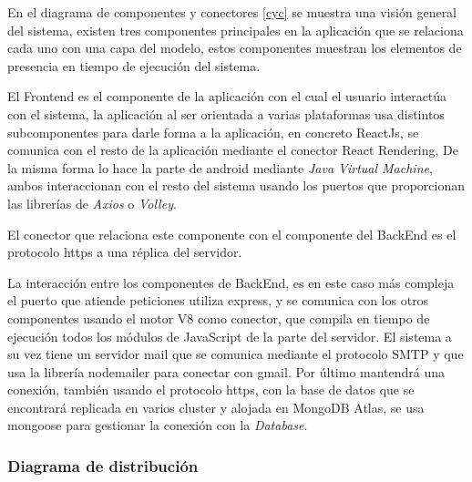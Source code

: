 \documentclass{article}
\begin{document}
En el diagrama de componentes y conectores \ref{cyc} se muestra una visión general del sistema, existen tres componentes principales en la aplicación que se relaciona cada uno con una capa del modelo, estos componentes muestran los elementos de presencia en tiempo de ejecución del sistema.

El Frontend es el componente de la aplicación con el cual el usuario interactúa con el sistema, la aplicación al ser orientada a varias plataformas usa distintos subcomponentes para darle forma a la aplicación, en concreto ReactJs, se comunica con el resto de la aplicación mediante el conector React Rendering, De la misma forma lo hace la parte de android mediante \textit{Java Virtual Machine}, ambos interaccionan con el resto del sistema usando los puertos que proporcionan las librerías de \textit{Axios} o \textit{Volley}.

El conector que relaciona este componente con el componente del BackEnd es el protocolo https a una réplica del servidor.

La interacción entre los componentes de BackEnd, es en este caso más compleja el puerto que atiende peticiones utiliza express, y se comunica con los otros componentes usando el motor V8 como conector, que compila en tiempo de ejecución todos los módulos de JavaScript de la parte del servidor. El sistema a su vez tiene un servidor mail que se comunica mediante el protocolo SMTP y que usa la librería nodemailer para conectar con gmail. Por último mantendrá una conexión, también usando el protocolo https, con la base de datos que se encontrará replicada en varios cluster y alojada en MongoDB Atlas, se usa mongoose para gestionar la conexión con la \textit{Database}.



\subsubsection*{Diagrama de distribución}
\end{document}
